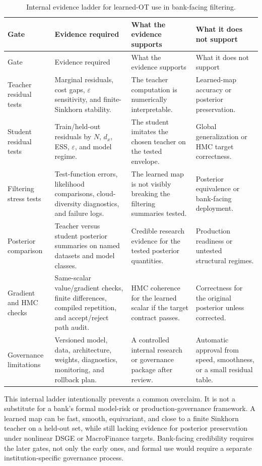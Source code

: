 \begin{longtable}{@{}p{} p{} p{} p{}@{}}
\caption{Internal evidence ladder for learned-OT use in bank-facing filtering.}
\label{tab:bf-learned-ot-banking-evidence}\\
\toprule
Gate & Evidence required & What the evidence supports & What it does not support \\
\midrule
\endfirsthead
\toprule
Gate & Evidence required & What the evidence supports & What it does not support \\
\midrule
\endhead
Teacher residual tests &
Marginal residuals, cost gaps, $\varepsilon$ sensitivity, and finite-Sinkhorn
stability. &
The teacher computation is numerically interpretable. &
Learned-map accuracy or posterior preservation. \\
Student residual tests &
Train/held-out residuals by $N$, $d_x$, ESS, $\varepsilon$, and model regime. &
The student imitates the chosen teacher on the tested envelope. &
Global generalization or HMC target correctness. \\
Filtering stress tests &
Test-function errors, likelihood comparisons, cloud-diversity diagnostics, and
failure logs. &
The learned map is not visibly breaking the filtering summaries tested. &
Posterior equivalence or bank-facing deployment. \\
Posterior comparison &
Teacher versus student posterior summaries on named datasets and model classes. &
Credible research evidence for the tested posterior quantities. &
Production readiness or untested structural regimes. \\
Gradient and HMC checks &
Same-scalar value/gradient checks, finite differences, compiled repetition, and
accept/reject path audit. &
HMC coherence for the learned scalar if the target contract passes. &
Correctness for the original posterior unless corrected. \\
Governance limitations &
Versioned model, data, architecture, weights, diagnostics, monitoring, and
rollback plan. &
A controlled internal research or governance package after review. &
Automatic approval from speed, smoothness, or a small residual table. \\
\bottomrule
\end{longtable}

This internal ladder intentionally prevents a common overclaim.  It is not a
substitute for a bank's formal model-risk or production-governance framework.
A learned map can be fast, smooth, equivariant, and close to a finite Sinkhorn
teacher on a held-out set, while still lacking evidence for posterior
preservation under nonlinear DSGE or MacroFinance targets.  Bank-facing
credibility requires the later gates, not only the early ones, and formal use
would require a separate institution-specific governance process.

